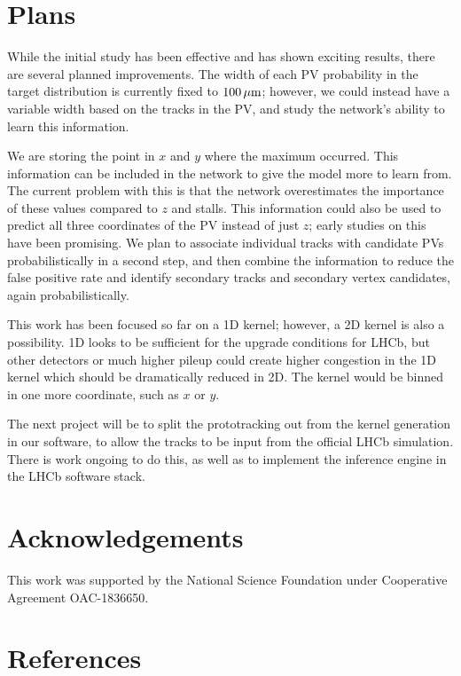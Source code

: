 \documentclass[a4paper]{jpconf}
\begin{document}
\section{Plans}

While the initial study has been effective and has shown exciting results, there are several planned improvements. The width of each PV probability in the target distribution is currently fixed to $\unit[100]{\mu m}$; however, we could instead have a variable width based on the tracks in the PV, and study the network's ability to learn this information.

We are storing the point in $x$ and $y$ where the maximum occurred. This information can be included in the network to give the model more to learn from. The current problem with this is that the network overestimates the importance of these values compared to $z$ and stalls. This information could also be used to predict all three coordinates of the PV instead of just $z$; early studies on this have been promising. We plan to associate individual tracks with candidate PVs  probabilistically in a second step, and then combine the information to reduce the false positive rate and identify secondary tracks and secondary vertex candidates, again probabilistically.

This work has been focused so far on a 1D kernel; however, a 2D kernel is also a possibility. 1D looks to be sufficient for the upgrade conditions for LHCb, but other detectors or much higher pileup could create higher congestion in the 1D kernel which should be dramatically reduced in 2D. The kernel would be binned in one more coordinate, such as $x$ or $y$.

The next project will be to split the prototracking out from the kernel generation in our software, to allow the tracks to be input from the official LHCb simulation. There is work ongoing to do this, as well as to implement the inference engine in the LHCb software stack.


\section*{Acknowledgements}

This work was supported by the National Science Foundation under Cooperative Agreement OAC-1836650.

\section*{References}


\end{document}
